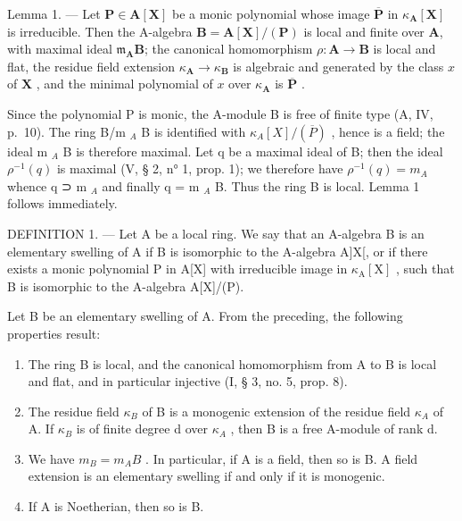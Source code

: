 Lemma 1. — Let \(\mathbf{P} \in \mathbf{A}[\mathbf{X}]\) be a monic polynomial whose image \(\overline{\mathbf{P}}\) in \(\kappa_{\mathbf{A}}[\mathbf{X}]\) is irreducible. Then the A-algebra \(\mathbf{B} = \mathbf{A}[\mathbf{X}] / (\mathbf{P})\) is local and finite over \(\mathbf{A}\), with maximal ideal \(\mathfrak{m}_{\mathbf{A}}\mathbf{B}\); the canonical homomorphism \(\rho: \mathbf{A} \to \mathbf{B}\) is local and flat, the residue field extension \(\kappa_{\mathbf{A}} \to \kappa_{\mathbf{B}}\) is algebraic and generated by the class \(x\) of \(\mathbf{X}\) , and the minimal polynomial of \(x\) over \(\kappa_{\mathbf{A}}\) is \(\overline{\mathbf{P}}\) .

Since the polynomial P is monic, the A-module B is free of finite type (A, IV, p.~10). The ring B/m \(_{A}\) B is identified with \(\kappa_{A}[X]/(\overline{P})\) , hence is a field; the ideal m \(_{A}\) B is therefore maximal. Let q be a maximal ideal of B; then the ideal \(\rho^{-1}(q)\) is maximal (V, § 2, n° 1, prop. 1); we therefore have \(\rho^{-1}(q)=m_{A}\) whence q ⊃ m \(_{A}\) and finally q = m \(_{A}\) B. Thus the ring B is local. Lemma 1 follows immediately.

DEFINITION 1. --- Let A be a local ring. We say that an A-algebra B is an elementary swelling of A if B is isomorphic to the A-algebra A{]}X{[}, or if there exists a monic polynomial P in A{[}X{]} with irreducible image in \(\kappa_{\mathrm{A}}[\mathrm{X}]\) , such that B is isomorphic to the A-algebra A{[}X{]}/(P).

Let B be an elementary swelling of A. From the preceding, the following properties result:

\begin{enumerate}
\def\labelenumi{\alph{enumi})}
\item
  The ring B is local, and the canonical homomorphism from A to B is local and flat, and in particular injective (I, § 3, no. 5, prop. 8).
\item
  The residue field \(\kappa_{B}\) of B is a monogenic extension of the residue field \(\kappa_{A}\) of A. If \(\kappa_{B}\) is of finite degree d over \(\kappa_{A}\) , then B is a free A-module of rank d.
\item
  We have \(m_{B} = m_{A}B\) . In particular, if A is a field, then so is B. A field extension is an elementary swelling if and only if it is monogenic.
\item
  If A is Noetherian, then so is B.
\end{enumerate}

